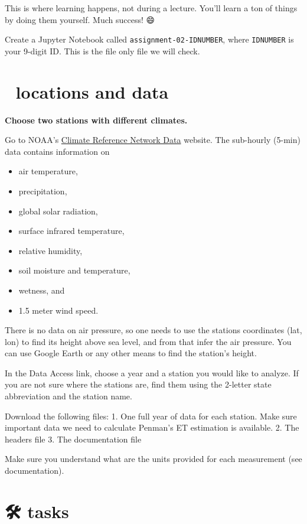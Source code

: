 \documentclass[
  letterpaper,
  DIV=11,
  numbers=noendperiod]{scrreprt}
\providecommand{\tightlist}{%
  \setlength{\itemsep}{0pt}\setlength{\parskip}{0pt}}\usepackage{longtable,booktabs,array}
\begin{document}
This is where learning happens, not during a lecture. You'll learn a ton
of things by doing them yourself. Much success! 😄

Create a Jupyter Notebook called \texttt{assignment-02-IDNUMBER}, where
\texttt{IDNUMBER} is your 9-digit ID. This is the file only file we will
check.

\hypertarget{locations-and-data}{%
\section{📌 locations and data}\label{locations-and-data}}

\textbf{Choose two stations with different climates.}

Go to NOAA's
\href{https://www.ncdc.noaa.gov/crn/qcdatasets.html}{Climate Reference
Network Data} website. The sub-hourly (5-min) data contains information
on

\begin{itemize}
\tightlist
\item
  air temperature,
\item
  precipitation,
\item
  global solar radiation,
\item
  surface infrared temperature,
\item
  relative humidity,
\item
  soil moisture and temperature,
\item
  wetness, and
\item
  1.5 meter wind speed.
\end{itemize}

There is no data on air pressure, so one needs to use the stations
coordinates (lat, lon) to find its height above sea level, and from that
infer the air pressure. You can use Google Earth or any other means to
find the station's height.

In the Data Access link, choose a year and a station you would like to
analyze. If you are not sure where the stations are, find them using the
2-letter state abbreviation and the station name.

Download the following files: 1. One full year of data for each station.
Make sure important data we need to calculate Penman's ET estimation is
available. 2. The headers file 3. The documentation file

Make sure you understand what are the units provided for each
measurement (see documentation).

\hypertarget{tasks-2}{%
\section{🛠 tasks}\label{tasks-2}}
\end{document}
